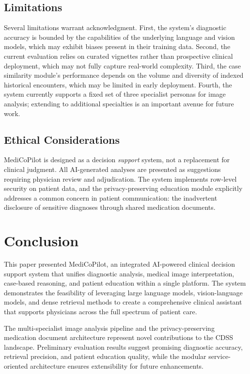 \documentclass[conference]{IEEEtran}
\begin{document}
\subsection{Limitations}
Several limitations warrant acknowledgment. First, the system's diagnostic accuracy is bounded by the capabilities of the underlying language and vision models, which may exhibit biases present in their training data. Second, the current evaluation relies on curated vignettes rather than prospective clinical deployment, which may not fully capture real-world complexity. Third, the case similarity module's performance depends on the volume and diversity of indexed historical encounters, which may be limited in early deployment. Fourth, the system currently supports a fixed set of three specialist personas for image analysis; extending to additional specialties is an important avenue for future work.

\subsection{Ethical Considerations}
MediCoPilot is designed as a decision \textit{support} system, not a replacement for clinical judgment. All AI-generated analyses are presented as suggestions requiring physician review and adjudication. The system implements row-level security on patient data, and the privacy-preserving education module explicitly addresses a common concern in patient communication: the inadvertent disclosure of sensitive diagnoses through shared medication documents.


\section{Conclusion}
\label{sec:conclusion}

This paper presented MediCoPilot, an integrated AI-powered clinical decision support system that unifies diagnostic analysis, medical image interpretation, case-based reasoning, and patient education within a single platform. The system demonstrates the feasibility of leveraging large language models, vision-language models, and dense retrieval methods to create a comprehensive clinical assistant that supports physicians across the full spectrum of patient care.

The multi-specialist image analysis pipeline and the privacy-preserving medication document architecture represent novel contributions to the CDSS landscape. Preliminary evaluation results suggest promising diagnostic accuracy, retrieval precision, and patient education quality, while the modular service-oriented architecture ensures extensibility for future enhancements.
\end{document}
